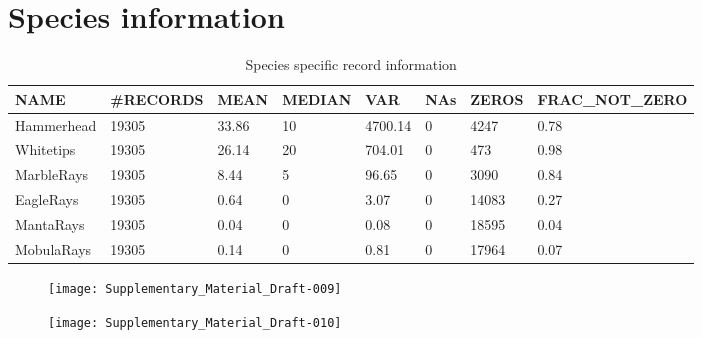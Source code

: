 \documentclass[a4paper]{article}
\begin{document}
\clearpage



\section{Species information}


\begin{table}[h!]
\centering
\begin{tabular}{llllllll}
  \hline
NAME & \#RECORDS & MEAN & MEDIAN & VAR & NAs & ZEROS & FRAC\_NOT\_ZERO \\ 
  \hline
Hammerhead & 19305 & 33.86 & 10 & 4700.14 & 0 & 4247 & 0.78 \\ 
  Whitetips & 19305 & 26.14 & 20 & 704.01 & 0 & 473 & 0.98 \\ 
  MarbleRays & 19305 & 8.44 & 5 & 96.65 & 0 & 3090 & 0.84 \\ 
  EagleRays & 19305 & 0.64 & 0 & 3.07 & 0 & 14083 & 0.27 \\ 
  MantaRays & 19305 & 0.04 & 0 & 0.08 & 0 & 18595 & 0.04 \\ 
  MobulaRays & 19305 & 0.14 & 0 & 0.81 & 0 & 17964 & 0.07 \\ 
   \hline
\end{tabular}
\caption{Species specific record information} 
\label{species_info}
\end{table}



\begin{figure}[h!]
\texttt{[image: Supplementary\_Material\_Draft-009]}
\end{figure}



\begin{figure}[h!]
\texttt{[image: Supplementary\_Material\_Draft-010]}
\end{figure}
\end{document}
